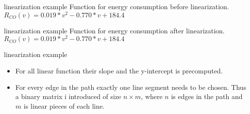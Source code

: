 \begin{frame}{linearization example}
Function for energy consumption before linearization. $R_{CO}(v)=0.019*v^2 - 0.770*v + 184.4$
\begin{figure}[!htb]
\label{fig:graph}
% 

\label{fig:graph}
\end{figure}
\end{frame}

\begin{frame}{linearization example}
Function for energy consumption after linearization. $R_{CO}(v)=0.019*v^2 - 0.770*v + 184.4$
\begin{figure}[!htb]
\label{fig:graph}
% 

\label{fig:graph}
\end{figure}

\end{frame}
\begin{frame}{linearization example}
\begin{itemize}
\item For all linear function their slope and the y-intercept is precomputed. 
\item For every edge in the path exactly one line segment needs to be chosen. Thus a binary matrix i introduced of size $n \times m$, where $n$ is edges in the path and $m$ is linear pieces of each line. 
\end{itemize}
\end{frame}



